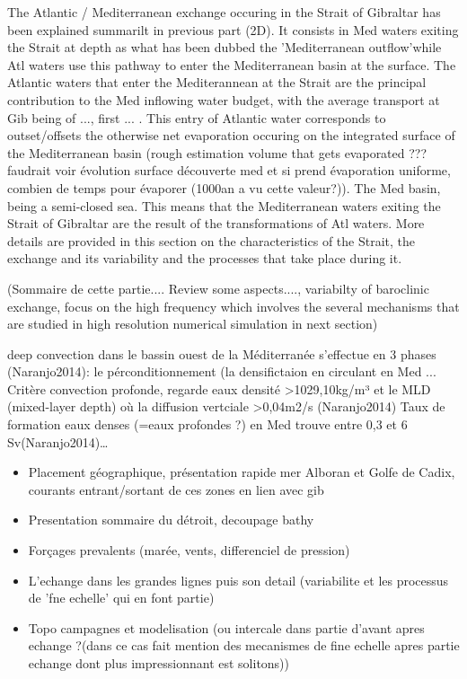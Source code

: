 The Atlantic / Mediterranean exchange occuring in the Strait of Gibraltar has been explained summarilt in previous part (2D). It consists in Med waters exiting the Strait at depth as what has been dubbed the 'Mediterranean outflow'while Atl waters use this pathway to enter the Mediterranean basin at the surface.
The Atlantic waters that enter the Mediterannean at the Strait are the principal contribution to the Med inflowing water budget, with the average transport at Gib being of ..., first ... . This entry of Atlantic water corresponds to outset/offsets the otherwise net evaporation occuring on the integrated surface of the Mediterranean basin (rough estimation volume that gets evaporated ??? faudrait voir évolution surface découverte med et si prend évaporation uniforme, combien de temps pour évaporer (1000an a vu cette valeur?)). The Med basin, being a semi-closed sea. This means that the Mediterranean waters exiting the Strait of Gibraltar are the result of the transformations of Atl waters.
More details are provided in this section on the characteristics of the Strait, the exchange and its variability and the processes that take place during it.



(Sommaire de cette partie.... Review some aspects...., variabilty of baroclinic exchange, focus on the high frequency which involves the several mechanisms that are studied in high resolution numerical simulation in next section)



deep convection dans le bassin ouest de la Méditerranée s’effectue en 3 phases (Naranjo2014): le pérconditionnement (la densifictaion en circulant en Med ... 
Critère convection profonde, regarde eaux densité >1029,10kg/m³ et le MLD (mixed-layer depth) où la diffusion vertciale >0,04m2/s (Naranjo2014)
Taux de formation eaux denses (=eaux profondes ?) en Med trouve entre 0,3 et 6 Sv(Naranjo2014)…


\begin{itemize}
\item Placement géographique, présentation rapide mer Alboran et Golfe de Cadix, courants entrant/sortant de ces zones en lien avec gib
\item Presentation sommaire du détroit, decoupage bathy 
\item Forçages prevalents (marée, vents, differenciel de pression)
\item L'echange dans les grandes lignes puis son detail (variabilite et les processus de 'fne echelle' qui en font partie)
\item Topo campagnes et modelisation (ou intercale dans partie d'avant apres echange ?(dans ce cas fait mention des mecanismes de fine echelle apres partie echange dont plus impressionnant est solitons))
\end{itemize}


